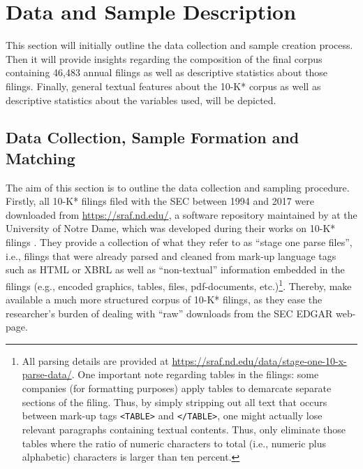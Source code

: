 \section{Data and Sample Description}
\label{sec: data_sample}

This section will initially outline the data collection and sample creation process. Then it will provide insights regarding the composition of the final corpus containing 46,483 annual filings as well as descriptive statistics about those filings. Finally, general textual features about the 10-K* corpus as well as descriptive statistics about the variables used, will be depicted. 


\subsection{Data Collection, Sample Formation and Matching}
\label{ssec: data_sample_collection-matching}

The aim of this section is to outline the data collection and sampling procedure. Firstly, all 10-K* filings filed with the SEC between 1994 and 2017 were downloaded from \url{https://sraf.nd.edu/}, a software repository maintained by \citeauthor{Loughran2014} at the University of Notre Dame, which was developed during their works on 10-K* filings \parencite{Loughran2011, Loughran2014}. They provide a collection of what they refer to as \enquote{stage one parse files}, i.e., filings that were already parsed and cleaned from mark-up language tags such as HTML or XBRL as well as \enquote{non-textual} information embedded in the filings (e.g., encoded graphics, tables, files, pdf-documents, etc.)\footnote{\label{fn: parsing_LM}All parsing details are provided at \url{https://sraf.nd.edu/data/stage-one-10-x-parse-data/}. One important note regarding tables in the filings: some companies (for formatting purposes) apply tables to demarcate separate sections of the filing. Thus, by simply stripping out all text that occurs between mark-up tags \texttt{<TABLE>} and \texttt{</TABLE>}, one might actually lose relevant paragraphs containing textual contents. Thus, \citeauthor{Loughran2014} only eliminate those tables where the ratio of numeric characters to total (i.e., numeric plus alphabetic) characters is larger than ten percent.}. Thereby, \citeauthor{Loughran2014} make available a much more structured corpus of 10-K* filings, as they ease the researcher's burden of dealing with \enquote{raw} downloads from the SEC EDGAR web-page.

